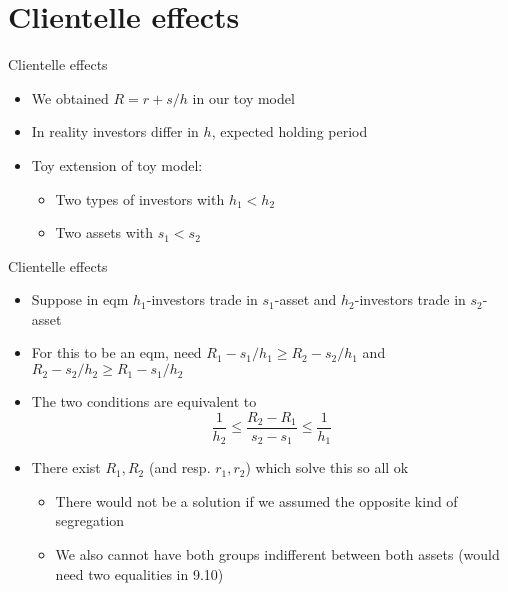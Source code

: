 \documentclass[english,10pt
,aspectratio=169
]{beamer}
\begin{document}
\section{Clientelle effects}

\begin{frame}{Clientelle effects}
	\begin{itemize}
		\item We obtained $R = r + s/h$ in our toy model
		\item In reality investors differ in $h$, expected holding period
		\item Toy extension of toy model:
		\begin{itemize}
			\item Two types of investors with $h_1 < h_2$
			\item Two assets with $s_1 < s_2$
		\end{itemize}
	\end{itemize}
\end{frame}


\begin{frame}{Clientelle effects}
	\begin{itemize}
		\item Suppose in eqm $h_1$-investors trade in $s_1$-asset and $h_2$-investors trade in $s_2$-asset
		\item For this to be an eqm, need $R_1 - s_1/h_1 \geq R_2 - s_2/h_1$ and $R_2 - s_2/h_2 \geq R_1 - s_1/h_2$
		\item The two conditions are equivalent to
		\begin{equation}\tag{9.10}
			\frac{1}{h_2} \leq \frac{R_2 - R_1}{s_2 - s_1} \leq \frac{1}{h_1}
		\end{equation}
		\pause 
		\item There exist $R_1,R_2$ (and resp. $r_1,r_2$) which solve this so all ok
		\begin{itemize}
			\item There would not be a solution if we assumed the opposite kind of segregation
			\item We also cannot have both groups indifferent between both assets (would need two equalities in 9.10)
		\end{itemize}
	\end{itemize}
\end{frame}
\end{document}
